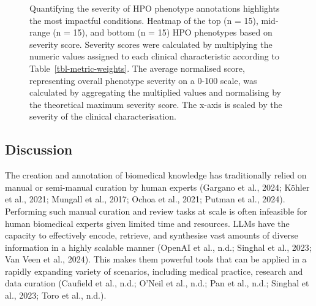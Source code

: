 \documentclass[
]{agujournal2019}
\begin{document}
\label{cell-fig-top-phenos}
\begin{figure}[H]


\caption{\label{fig-top-phenos}Quantifying the severity of HPO phenotype
annotations highlights the most impactful conditions. Heatmap of the top
(n = 15), mid-range (n = 15), and bottom (n = 15) HPO phenotypes based
on severity score. Severity scores were calculated by multiplying the
numeric values assigned to each clinical characteristic according to
Table~\ref{tbl-metric-weights}. The average normalised score,
representing overall phenotype severity on a 0-100 scale, was calculated
by aggregating the multiplied values and normalising by the theoretical
maximum severity score. The x-axis is scaled by the severity of the
clinical characterisation.}

\end{figure}%

\subsection{Discussion}\label{discussion}

The creation and annotation of biomedical knowledge has traditionally
relied on manual or semi-manual curation by human experts (Gargano et
al., 2024; Köhler et al., 2021; Mungall et al., 2017; Ochoa et al.,
2021; Putman et al., 2024). Performing such manual curation and review
tasks at scale is often infeasible for human biomedical experts given
limited time and resources. LLMs have the capacity to effectively
encode, retrieve, and synthesise vast amounts of diverse information in
a highly scalable manner (OpenAI et al., n.d.; Singhal et al., 2023; Van
Veen et al., 2024). This makes them powerful tools that can be applied
in a rapidly expanding variety of scenarios, including medical practice,
research and data curation (Caufield et al., n.d.; O'Neil et al., n.d.;
Pan et al., n.d.; Singhal et al., 2023; Toro et al., n.d.).
\end{document}
